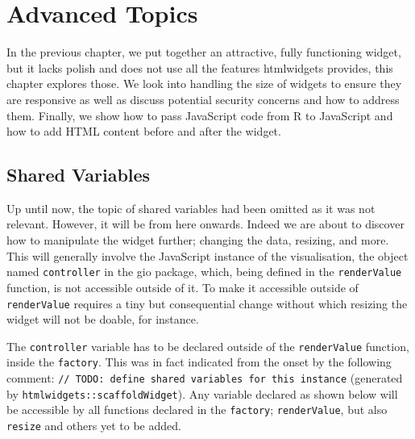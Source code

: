 \documentclass[
]{krantz}
\begin{document}
\hypertarget{widgets-adv}{%
\chapter{Advanced Topics}\label{widgets-adv}}

In the previous chapter, we put together an attractive, fully functioning widget, but it lacks polish and does not use all the features htmlwidgets provides, this chapter explores those. We look into handling the size of widgets to ensure they are responsive as well as discuss potential security concerns and how to address them. Finally, we show how to pass JavaScript code from R to JavaScript and how to add HTML content before and after the widget.

\hypertarget{widgets-adv-shared}{%
\section{Shared Variables}\label{widgets-adv-shared}}

Up until now, the topic of shared variables had been omitted as it was not relevant. However, it will be from here onwards. Indeed we are about to discover how to manipulate the widget further; changing the data, resizing, and more. This will generally involve the JavaScript instance of the visualisation, the object named \texttt{controller} in the gio package, which, being defined in the \texttt{renderValue} function, is not accessible outside of it. To make it accessible outside of \texttt{renderValue} requires a tiny but consequential change without which resizing the widget will not be doable, for instance.

The \texttt{controller} variable has to be declared outside of the \texttt{renderValue} function, inside the \texttt{factory}. This was in fact indicated from the onset by the following comment: \texttt{//\ TODO:\ define\ shared\ variables\ for\ this\ instance} (generated by \texttt{htmlwidgets::scaffoldWidget}). Any variable declared as shown below will be accessible by all functions declared in the \texttt{factory}; \texttt{renderValue}, but also \texttt{resize} and others yet to be added.
\end{document}
